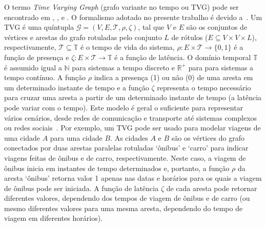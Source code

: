 \textcolor{courb2020}{
O termo \emph{Time Varying Graph} (grafo variante no tempo ou TVG) pode ser encontrado em \cite{sant:09}, \cite{tang:10}, \cite{lat:10} e \cite{lat:12}. O formalismo adotado no presente trabalho é devido a~\cite{sant:12}. 
}
\textcolor{courb2020}{
Um TVG é uma quíntupla $\mathcal{G}=(V,E,\mathcal{T},\rho,\zeta)$, tal que $V$ e $E$ são os conjuntos de vértices e arestas do grafo rotuladas pelo conjunto $L$ de rótulos ($E \subseteq V \times V \times L$), respectivamente, $\mathcal{T}\subseteq \mathbb{T}$ é o tempo de vida do sistema, $\rho: E \times \mathcal{T} \rightarrow \{0,1\}$ é a função de presença e $\zeta: E \times \mathcal{T} \rightarrow \mathbb{T}$ é a função de latência. O domínio temporal $\mathbb{T}$ é assumido igual a $\mathbb{N}$ para sistemas a tempo discreto e $\mathbb{R}^+$ para para sistemas a tempo contínuo.
}
\textcolor{courb2020}{
A função $\rho$ indica a presença (1) ou não (0) de uma aresta em um determinado instante de tempo e a função $\zeta$ representa o tempo necessário para cruzar uma aresta a partir de um determinado instante de tempo (a latência pode variar com o tempo). Este modelo é geral o suficiente para representar vários cenários, desde redes de comunicação e transporte até sistemas complexos ou redes sociais~\cite{sant:12}. 
}
\textcolor{courb2020}{
Por exemplo, um TVG pode ser usado para modelar viagens de uma cidade $A$ para uma cidade $B$. As cidades $A$ e $B$ são os vértices do grafo conectados por duas arestas paralelas rotuladas `ônibus' e `carro' para indicar viagens feitas de ônibus e de carro, respectivamente. Neste caso, a viagem de ônibus inicia em instantes de tempo determinados e, portanto, a função $\rho$ da aresta `ônibus' retorna valor 1 apenas nas datas e horários para os quais a viagem de ônibus pode ser iniciada. A função de latência $\zeta$ de cada aresta  pode retornar diferentes valores, dependendo dos tempos de viagem de ônibus e de carro (ou mesmo diferentes valores para uma mesma aresta, dependendo do tempo de viagem em diferentes horários).
}
